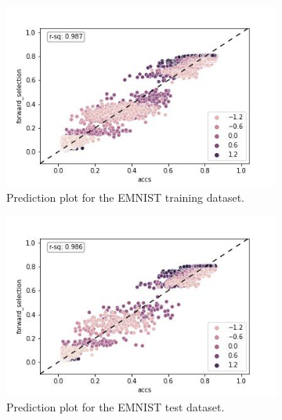 \documentclass{article} %
\begin{document}
\begin{figure}
    \begin{subfigure}{.33\textwidth}
        \centering
        \includegraphics[width=.98\linewidth]{emnist/arctan_all_epochs_forward_selection.jpg}
        \caption{Prediction plot for the EMNIST training dataset.}
        \label{fig:emnist_prediction_plot_train}
    \end{subfigure}%
    \begin{subfigure}{.33\textwidth}
        \centering
        \includegraphics[width=.98\linewidth]{emnist/arctan_all_epochs_forward_selection_val.jpg}
        \caption{Prediction plot for the EMNIST test dataset.}
        \label{fig:emnist_prediction_plot_val}
    \end{subfigure}
    \begin{subfigure}{.33\textwidth}
        \centering

\end{subfigure}
\end{figure}
\end{document}
